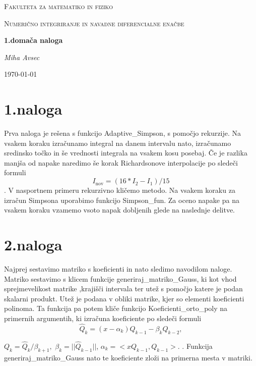 \documentclass[11pt]{article} %
\begin{document}
\begin{titlepage}
\centering
{\scshape\LARGE Fakulteta za matematiko in fiziko \par}
\vspace{1cm}
{\scshape\Large Numerično integriranje in navadne diferencialne enačbe\par}
\vspace{1.5cm}
{\huge\bfseries 1.domača naloga\par}
\vspace{2cm}
{\Large\itshape Miha Avsec\par}
\vfill

\vfill

{\large \today\par}
\end{titlepage}


\section{1.naloga}

Prva naloga je rešena s funkcijo Adaptive\_Simpson, s pomočjo rekurzije. Na vsakem koraku izračunamo integral na danem intervalu nato, izračunamo sredinsko točko in še vrednosti integrala na vsakem kosu posebaj. Če je razlika manjša od napake naredimo še korak Richardsonove interpolacije po sledeči formuli
$$I_{\text{nov}} = (16*I_2-I_1)/15$$.
V nasportnem primeru rekurzivno kličemo metodo. Na vsakem koraku za izračun Simpsona uporabimo funkcijo Simpson\_fun. Za oceno napake pa na vsakem koraku vzamemo vsoto napak dobljenih glede na naslednje delitve.

\section{2.naloga}
Najprej sestavimo matriko s koeficienti in nato sledimo navodilom naloge. Matriko sestavimo s klicem funkcije generiraj\_matriko\_Gauss, ki kot vhod sprejmevelikost matrike ,krajišči intervala ter utež s pomočjo katere je podan skalarni produkt. Utež je podana v obliki matrike, kjer so elementi koeficienti polinoma. Ta funkcija pa potem kliče funkcijo Koeficienti\_orto\_poly na primernih argumentih, ki izračuna koeficiente po sledeči formuli
$$\hat{Q}_k = (x-\alpha_k)Q_{k-1} - \beta_k Q_{k-2},$$

  $ Q_k = \hat{Q}_k/\beta_{k+1},$    $\beta_k = || \hat{Q}_{k-1} ||$,  $\alpha_k = <xQ_{k-1},Q_{k-1}>$.
.
Funkcija generiraj\_matriko\_Gauss nato te koeficiente zloži na primerna mesta v matriki.
\end{document}
